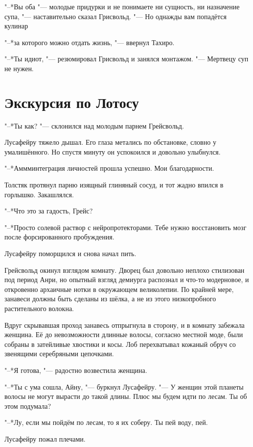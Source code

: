 "--*Вы оба "--- молодые придурки и не понимаете ни сущность, ни назначение супа, "--- наставительно сказал Грисвольд.
"--- Но однажды вам попадётся кулинар\ldotst

"--*\ldotst за которого можно отдать жизнь, "--- ввернул Тахиро.

"--*Ты идиот, "--- резюмировал Грисвольд и занялся монтажом.
"--- Мертвецу суп не нужен.

\section{Экскурсия по Лотосу}

"--*Ты как? "--- склонился над молодым парнем Грейсвольд.

Лусафейру тяжело дышал.
Его глаза метались по обстановке, словно у умалишённого. Но спустя минуту он успокоился и довольно улыбнулся.

"--*Аммм\ldotst интеграция личностей прошла успешно.
Мои благодарности.

Толстяк протянул парню изящный глиняный сосуд, и тот жадно впился в горлышко.
Закашлялся.

"--*Что это за гадость, Грейс?

"--*Просто солевой раствор с нейропротекторами.
Тебе нужно восстановить мозг после форсированного пробуждения.

Лусафейру поморщился и снова начал пить.

Грейсвольд окинул взглядом комнату.
Дворец был довольно неплохо стилизован под период Анри, но опытный взгляд демиурга распознал и что-то модерновое, и откровенно архаичные нотки в окружающем великолепии.
По крайней мере, занавеси должны быть сделаны из шёлка, а не из этого низкопробного растительного волокна.

Вдруг скрывавшая проход занавесь отпрыгнула в сторону, и в комнату забежала женщина.
Её до невозможности длинные волосы, согласно местной моде, были собраны в затейливые хвостики и косы.
Лоб перехватывал кожаный обруч со звенящими серебряными цепочками.

"--*Я готова, "--- радостно возвестила женщина.

"--*Ты с ума сошла, Айну, "--- буркнул Лусафейру.
"--- У женщин этой планеты волосы не могут вырасти до такой длины.
Плюс мы будем идти по лесам.
Ты об этом подумала?

"--*Лу, если мы пойдём по лесам, то я их соберу.
Ты пей воду, пей.

Лусафейру пожал плечами.

